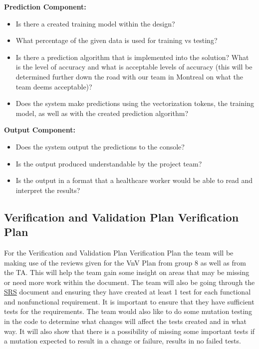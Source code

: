\documentclass[12pt, titlepage]{article}
\begin{document}
  \noindent \textbf{Prediction Component:}
  \begin{itemize}
  \item Is there a created training model within the design?
  \item What percentage of the given data is used for training vs testing?
  \item Is there a prediction algorithm that is implemented into the solution? What is the level of accuracy and what is acceptable levels of accuracy (this will be determined further down the road with our team in Montreal on what the team deems acceptable)?
  \item Does the system make predictions using the vectorization tokens, the training model, as well as with the created prediction algorithm?\\
  \end{itemize}
  
  
  \noindent \textbf{Output Component:}
  \begin{itemize}
  \item Does the system output the predictions to the console?
  \item Is the output produced understandable by the project team?
  \item Is the output in a format that a healthcare worker would be able to read and interpret the results?
  \end{itemize}
  
  
  \subsection{Verification and Validation Plan Verification Plan}\label{Verification and Validation Plan Verification Plan}
  
  For the Verification and Validation Plan Verification Plan the team will be making use of the reviews given for the VnV Plan from group 8 as well as from the TA. This will help the team gain some insight on areas that may be missing or need more work within the document. The team will also be going through the \href{https://github.com/MichaelBreau/nlp-mentalhealth/blob/main/docs/SRS/index.pdf}{SRS} document and ensuring they have created at least 1 test for each functional and nonfunctional requirement. It is important to ensure that they have sufficient tests for the requirements. The team would also like to do some mutation testing in the code to determine what changes will affect the tests created and in what way. It will also show that there is a possibility of missing some important tests if a mutation expected to result in a change or failure, results in no failed tests.\\ 
\end{document}
